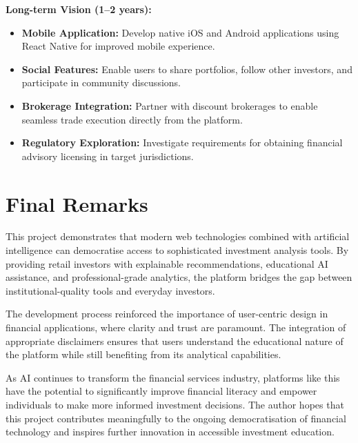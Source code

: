 \textbf{Long-term Vision (1--2 years):}
\begin{itemize}
    \item \textbf{Mobile Application:} Develop native iOS and Android applications using React Native for improved mobile experience.
    \item \textbf{Social Features:} Enable users to share portfolios, follow other investors, and participate in community discussions.
    \item \textbf{Brokerage Integration:} Partner with discount brokerages to enable seamless trade execution directly from the platform.
    \item \textbf{Regulatory Exploration:} Investigate requirements for obtaining financial advisory licensing in target jurisdictions.
\end{itemize}

\section{Final Remarks}
\label{sec:final-remarks}

This project demonstrates that modern web technologies combined with artificial intelligence can democratise access to sophisticated investment analysis tools. By providing retail investors with explainable recommendations, educational AI assistance, and professional-grade analytics, the platform bridges the gap between institutional-quality tools and everyday investors.

The development process reinforced the importance of user-centric design in financial applications, where clarity and trust are paramount. The integration of appropriate disclaimers ensures that users understand the educational nature of the platform while still benefiting from its analytical capabilities.

As AI continues to transform the financial services industry, platforms like this have the potential to significantly improve financial literacy and empower individuals to make more informed investment decisions. The author hopes that this project contributes meaningfully to the ongoing democratisation of financial technology and inspires further innovation in accessible investment education.
